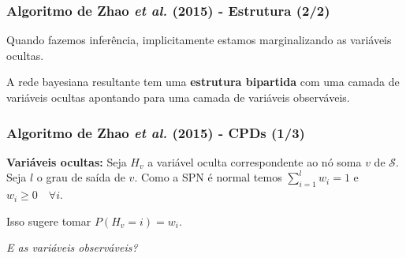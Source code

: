 \documentclass[dvipsnames]{beamer}
\begin{document}
  \begin{frame}
    \frametitle{Algoritmo de Zhao \emph{et al.} (2015) - Estrutura (2/2)}




    Quando fazemos inferência, implicitamente estamos marginalizando as variáveis ocultas.

    \vspace{1em}

    A rede bayesiana resultante tem uma \textbf{estrutura bipartida} com uma camada de variáveis ocultas apontando para uma camada de variáveis observáveis.
  \end{frame}

  \begin{frame}
    \frametitle{Algoritmo de Zhao \emph{et al.} (2015) - CPDs (1/3)}

    \textbf{Variáveis ocultas:} Seja $H_v$ a variável oculta correspondente ao nó soma $v$ de $\mathcal{S}$. Seja $l$ o grau de saída de $v$. Como a SPN é normal temos $\sum_{i=1}^l w_i = 1$ e $w_i \geq 0 \quad \forall i$.

    \vspace{1em}

    Isso sugere tomar $P(H_v = i) = w_i$.

    \vspace{2em}

    \emph{E as variáveis observáveis?}
  \end{frame}
\end{document}
